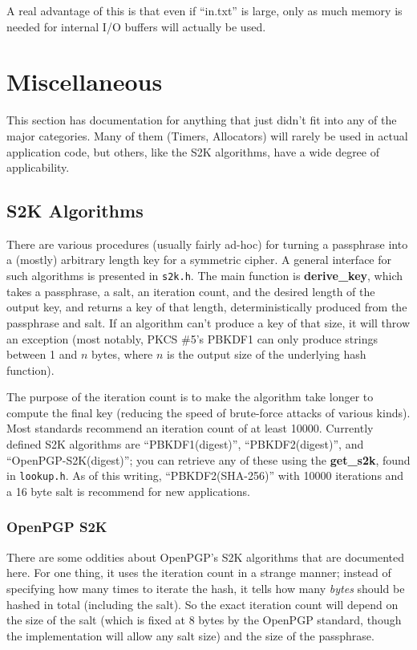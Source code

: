 \documentclass{article}
\newcommand{\filename}[1]{\texttt{#1}}
\newcommand{\function}[1]{\textbf{#1}}
\begin{document}
A real advantage of this is that even if ``in.txt'' is large, only as
much memory is needed for internal I/O buffers will actually be used.

\pagebreak
\section{Miscellaneous}

This section has documentation for anything that just didn't fit into any of
the major categories. Many of them (Timers, Allocators) will rarely be used in
actual application code, but others, like the S2K algorithms, have a wide
degree of applicability.

\subsection{S2K Algorithms}

There are various procedures (usually fairly ad-hoc) for turning a
passphrase into a (mostly) arbitrary length key for a symmetric
cipher. A general interface for such algorithms is presented in
\filename{s2k.h}. The main function is \function{derive\_key}, which
takes a passphrase, a salt, an iteration count, and the desired length
of the output key, and returns a key of that length, deterministically
produced from the passphrase and salt. If an algorithm can't produce a
key of that size, it will throw an exception (most notably, PKCS \#5's
PBKDF1 can only produce strings between 1 and $n$ bytes, where $n$ is
the output size of the underlying hash function).

The purpose of the iteration count is to make the algorithm take
longer to compute the final key (reducing the speed of brute-force
attacks of various kinds). Most standards recommend an iteration count
of at least 10000. Currently defined S2K algorithms are
``PBKDF1(digest)'', ``PBKDF2(digest)'', and ``OpenPGP-S2K(digest)'';
you can retrieve any of these using the \function{get\_s2k}, found in
\filename{lookup.h}. As of this writing, ``PBKDF2(SHA-256)'' with
10000 iterations and a 16 byte salt is recommend for new applications.

\subsubsection{OpenPGP S2K}

There are some oddities about OpenPGP's S2K algorithms that are
documented here. For one thing, it uses the iteration count in a
strange manner; instead of specifying how many times to iterate the
hash, it tells how many \emph{bytes} should be hashed in total
(including the salt). So the exact iteration count will depend on the
size of the salt (which is fixed at 8 bytes by the OpenPGP standard,
though the implementation will allow any salt size) and the size of
the passphrase.
\end{document}
